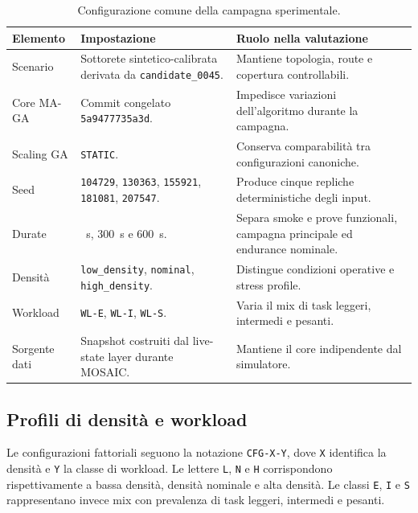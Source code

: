 \begin{table}[htbp]
    \centering
    \caption{Configurazione comune della campagna sperimentale.}
    \label{tab:exp_setup}
    \small
    \begin{tabularx}{\textwidth}{
        >{\raggedright\arraybackslash}p{}
        >{\raggedright\arraybackslash}X
        >{\raggedright\arraybackslash}p{}
    }
        \toprule
        \textbf{Elemento} &
        \textbf{Impostazione} &
        \textbf{Ruolo nella valutazione} \\
        \midrule
        Scenario &
        Sottorete sintetico-calibrata derivata da \texttt{candidate\_0045}. &
        Mantiene topologia, route e copertura controllabili. \\
        Core MA-GA &
        Commit congelato \texttt{5a9477735a3d}. &
        Impedisce variazioni dell'algoritmo durante la campagna. \\
        Scaling GA &
        \texttt{STATIC}. &
        Conserva comparabilità tra configurazioni canoniche. \\
        Seed &
        \texttt{104729}, \texttt{130363}, \texttt{155921}, \texttt{181081}, \texttt{207547}. &
        Produce cinque repliche deterministiche degli input. \\
        Durate &
        180~s, 300~s e 600~s. &
        Separa smoke e prove funzionali, campagna principale ed endurance nominale. \\
        Densità &
        \texttt{low\_density}, \texttt{nominal}, \texttt{high\_density}. &
        Distingue condizioni operative e stress profile. \\
        Workload &
        \texttt{WL-E}, \texttt{WL-I}, \texttt{WL-S}. &
        Varia il mix di task leggeri, intermedi e pesanti. \\
        Sorgente dati &
        Snapshot costruiti dal live-state layer durante MOSAIC. &
        Mantiene il core indipendente dal simulatore. \\
        \bottomrule
    \end{tabularx}
\end{table}

\subsection{Profili di densità e workload}
\label{subsec:exp_profili}

Le configurazioni fattoriali seguono la notazione \texttt{CFG-X-Y}, dove \texttt{X} identifica la densità e \texttt{Y} la classe di workload. Le lettere \texttt{L}, \texttt{N} e \texttt{H} corrispondono rispettivamente a bassa densità, densità nominale e alta densità. Le classi \texttt{E}, \texttt{I} e \texttt{S} rappresentano invece mix con prevalenza di task leggeri, intermedi e pesanti.

